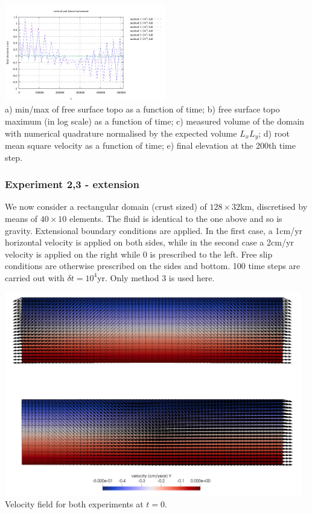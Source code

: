\begin{center}
   \includegraphics[width=7cm]{python_codes/fieldstone_54/images/exp1/surface_topography_200_full.pdf}\\
{\scriptsize 
a) min/max of free surface topo as a function of time; 
b) free surface topo maximum (in log scale) as a function of time; 
c) measured volume of the domain with numerical quadrature normalised by the expected volume $L_xL_y$;
d) root mean square velocity as a function of time;
e) final elevation at the 200th time step.}
\end{center}

\subsubsection*{Experiment 2,3 - extension}

We now consider a rectangular domain (crust sized) of $128\times32$km, discretised by means of $40\times10$ elements.
The fluid is identical to the one above and so is gravity. 
Extensional boundary conditions are applied. In the first case, a 1cm/yr horizontal velocity is applied on both sides, while in the second case a 2cm/yr velocity is applied on the right while 0 is prescribed to the left. Free slip conditions are otherwise prescribed on the sides and bottom. 100 time steps are carried out with $\delta t=10^4$yr. Only method 3 is used here.

\begin{center}
\includegraphics[width=13cm]{python_codes/fieldstone_54/images/exp2-3/vel0}\\
{\scriptsize Velocity field for both experiments at $t=0$.}
\end{center}


